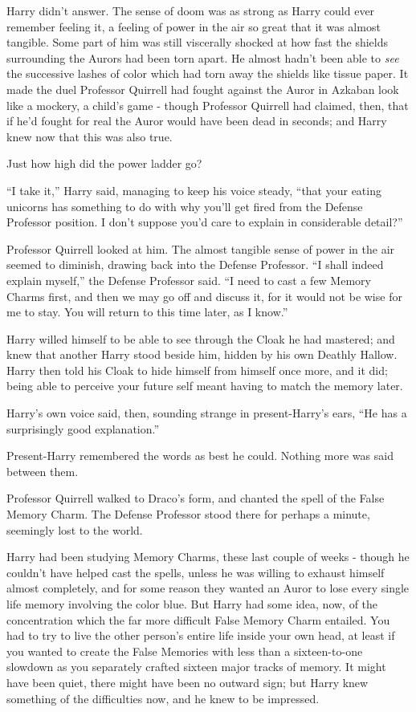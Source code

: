 Harry didn't answer. The sense of doom was as strong as Harry could ever
remember feeling it, a feeling of power in the air so great that it was
almost tangible. Some part of him was still viscerally shocked at how
fast the shields surrounding the Aurors had been torn apart. He almost
hadn't been able to \emph{see} the successive lashes of color which had
torn away the shields like tissue paper. It made the duel Professor
Quirrell had fought against the Auror in Azkaban look like a mockery, a
child's game - though Professor Quirrell had claimed, then, that if he'd
fought for real the Auror would have been dead in seconds; and Harry
knew now that this was also true.

Just how high did the power ladder go?

``I take it,'' Harry said, managing to keep his voice steady, ``that
your eating unicorns has something to do with why you'll get fired from
the Defense Professor position. I don't suppose you'd care to explain in
considerable detail?''

Professor Quirrell looked at him. The almost tangible sense of power in
the air seemed to diminish, drawing back into the Defense Professor. ``I
shall indeed explain myself,'' the Defense Professor said. ``I need to
cast a few Memory Charms first, and then we may go off and discuss it,
for it would not be wise for me to stay. You will return to this time
later, as I know.''

Harry willed himself to be able to see through the Cloak he had
mastered; and knew that another Harry stood beside him, hidden by his
own Deathly Hallow. Harry then told his Cloak to hide himself from
himself once more, and it did; being able to perceive your future self
meant having to match the memory later.

Harry's own voice said, then, sounding strange in present-Harry's ears,
``He has a surprisingly good explanation.''

Present-Harry remembered the words as best he could. Nothing more was
said between them.

Professor Quirrell walked to Draco's form, and chanted the spell of the
False Memory Charm. The Defense Professor stood there for perhaps a
minute, seemingly lost to the world.

Harry had been studying Memory Charms, these last couple of weeks -
though he couldn't have helped cast the spells, unless he was willing to
exhaust himself almost completely, and for some reason they wanted an
Auror to lose every single life memory involving the color blue. But
Harry had some idea, now, of the concentration which the far more
difficult False Memory Charm entailed. You had to try to live the other
person's entire life inside your own head, at least if you wanted to
create the False Memories with less than a sixteen-to-one slowdown as
you separately crafted sixteen major tracks of memory. It might have
been quiet, there might have been no outward sign; but Harry knew
something of the difficulties now, and he knew to be impressed.

